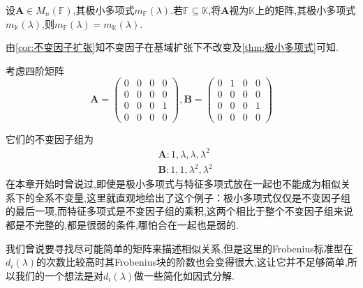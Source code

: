 \begin{green}
\begin{corollary}[极小多项式扩张不变]
    设$\bm{A}\in M_n\left(\mathbb{F}\right)$,其极小多项式$m_{\mathbb{F}}\left(\lambda\right)$.若$\mathbb{F}\subseteq\mathbb{K}$,将$\bm{A}$视为$\mathbb{K}$上的矩阵,其极小多项式$m_{\mathbb{K}}\left(\lambda\right)$,则$m_{\mathbb{F}}\left(\lambda\right)=m_{\mathbb{K}}\left(\lambda\right).$
\end{corollary}
\begin{Proof}
由\cref{cor:不变因子扩张}知不变因子在基域扩张下不改变及\cref{thm:极小多项式}可知.
\end{Proof}
\end{green}
\begin{brown}
\begin{example}
    考虑四阶矩阵
    \[
    \bm{A}=\begin{pmatrix}
        0&0&0&0\\
        0&0&0&0\\
        0&0&0&1\\
        0&0&0&0
    \end{pmatrix},\bm{B}=\begin{pmatrix}
        0&1&0&0\\
        0&0&0&0\\
        0&0&0&1\\
        0&0&0&0
    \end{pmatrix}
    \]
\end{example}
\begin{solution}
    它们的不变因子组为
    \begin{align*}
        &\bm{A}:1,\lambda,\lambda,\lambda^2\\
        &\bm{B}:1,1,\lambda^2,\lambda^2
    \end{align*}
    在本章开始时曾说过,即使是极小多项式与特征多项式放在一起也不能成为相似关系下的全系不变量,这里就直观地给出了这个例子：极小多项式仅仅是不变因子组的最后一项,而特征多项式是不变因子组的乘积,这两个相比于整个不变因子组来说都是不完整的,都是很弱的条件,哪怕合在一起也是弱的.
\end{solution}
\end{brown}
\begin{red}
    \begin{remark}
        我们曾说要寻找尽可能简单的矩阵来描述相似关系,但是这里的\textup{Frobenius}标准型在$d_i\left(\lambda\right)$的次数比较高时其\textup{Frobenius}块的阶数也会变得很大,这让它并不足够简单,所以我们的一个想法是对$d_i\left(\lambda\right)$做一些简化如因式分解.
    \end{remark}
\end{red}
\newpage
